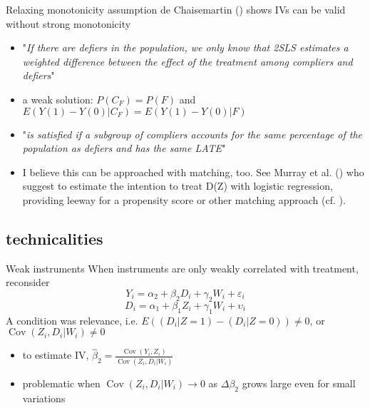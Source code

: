 \documentclass[aspectratio=169]{beamer}
\newcommand{\Cov}{\operatorname{Cov}}
\begin{document}
		\begin{frame}{Relaxing monotonicity assumption}
			de Chaisemartin (\citeyear{DeChaisemartin2017}) shows IVs can be valid without strong monotonicity \\ \vspace*{.15cm}
			\begin{itemize}
				\item "\textit{If there are defiers in the population, we only know that 2SLS estimates a weighted difference between the effect of the treatment among compliers and defiers}"
				\item<2->  a weak solution: $P(C_F)=P(F)$ and $E(Y(1) - Y(0) |  C_F) = E(Y(1) - Y(0) |  F) $
				\item<3-> "\textit{is satisfied if a subgroup of compliers accounts for the same percentage of the population as defiers and has the same LATE}"
				\item<4-> I believe this can be approached with matching, too. See Murray et al. (\citeyear{Murray2021}) who suggest to estimate the intention to treat D(Z) with logistic regression, providing leeway for a propensity score or other matching approach (cf. \cite{Hirano2003, Rosenbaum1984}).
			\end{itemize}
		\end{frame}

	\subsection{technicalities}
		\begin{frame}{Weak instruments}
			When instruments are only weakly correlated with treatment, reconsider
			\begin{equation}
				Y_{i} = \alpha_2 + \beta_2 {D}_{i} + \gamma_2 W_{i} + \varepsilon_{i}
			\end{equation}
			\begin{equation}
				D_{i} = \alpha_1 + \beta_1 Z_{i} + \gamma_1 W_{i} + \upsilon_{i}
			\end{equation}
			\vspace*{.15cm}
			A condition was relevance, i.e. $E((D_i|Z=1)-(D_i|Z=0)) \neq 0$, or $\Cov(Z_i,D_i|W_i) \neq 0$
			\begin{itemize}
			 \item to estimate IV, $\widehat{\beta}_2=\frac{\Cov(Y_i,Z_i)}{\Cov(Z_i,D_i|W_i)}$
			 \item problematic when $\Cov(Z_i,D_i|W_i) \to 0$ as $\Delta \beta_2$ grows large even for small variations
			\end{itemize}
		\end{frame}
\end{document}
